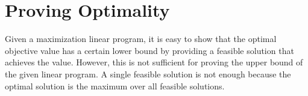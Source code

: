 \section{Proving Optimality}

Given a maximization linear program, it is easy to show that the optimal objective value has a certain lower bound by providing a feasible solution that achieves the value. However, this is not sufficient for proving the upper bound of the given linear program. A single feasible solution is not enough because the optimal solution is the maximum over all feasible solutions.
